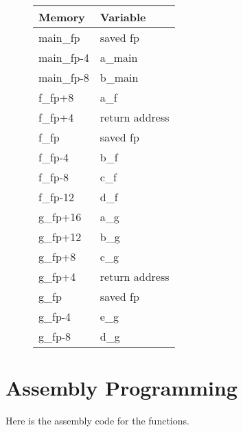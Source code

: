 \documentclass[paper=a4, fontsize=11pt]{scrartcl} %
\numberwithin{equation}{section} %
\numberwithin{figure}{section} %
\numberwithin{table}{section} %
\begin{document}
\begin{figure}[ht!]
    \begin{center}
    \begin{tabular}{|l|l|}
    \hline
    Memory    & Variable       \\
    \hline
    main\_fp  & saved fp       \\
    \hline
    main\_fp-4 & a\_main        \\
    \hline
    main\_fp-8 & b\_main        \\
    f\_fp+8   & a\_f           \\
    \hline
    f\_fp+4   & return address \\
    \hline
    f\_fp     & saved fp       \\
    \hline
    f\_fp-4   & b\_f           \\
    \hline
    f\_fp-8   & c\_f           \\
    \hline
    f\_fp-12  & d\_f           \\
    \hline
    g\_fp+16  & a\_g           \\
    \hline
    g\_fp+12  & b\_g           \\
    \hline
    g\_fp+8   & c\_g           \\
    \hline
    g\_fp+4   & return address \\
    \hline
    g\_fp     & saved fp       \\
    \hline
    g\_fp-4   & e\_g           \\
    \hline
    g\_fp-8   & d\_g           \\
    \hline
    \end{tabular}
    \end{center}
\end{figure}

\section{Assembly Programming}

Here is the assembly code for the functions.
\begin{figure}[ht!]
\end{figure}
\end{document}
